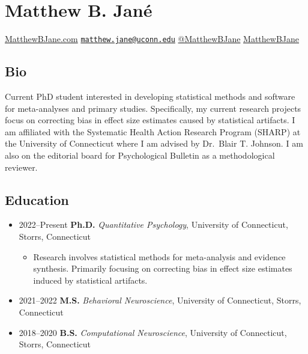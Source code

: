 \documentclass[
  letterpaper,
  DIV=11,
  numbers=noendperiod]{scrartcl}
\author{}
\date{}
\providecommand{\tightlist}{%
  \setlength{\itemsep}{0pt}\setlength{\parskip}{0pt}}\usepackage{longtable,booktabs,array}
\begin{document}
\ifdefined\Shaded\renewenvironment{Shaded}{\begin{tcolorbox}[enhanced, sharp corners, boxrule=0pt, frame hidden, interior hidden, breakable, borderline west={3pt}{0pt}{shadecolor}]}{\end{tcolorbox}}\fi

\hypertarget{matthew-b.-januxe9}{%
\section{Matthew B. Jané}\label{matthew-b.-januxe9}}

 \href{https://www.matthewbjane.com}{MatthewBJane.com}
\textbar{} 
\href{mailto:matthew.jane@uconn.edu}{\nolinkurl{matthew.jane@uconn.edu}}
\textbar{} 
\href{https://www.twitter.com/MatthewBJane}{@MatthewBJane} \textbar{}
 \href{https://www.github.io/MatthewBJane}{MatthewBJane}

\hypertarget{bio}{%
\subsection{\texorpdfstring{ Bio}{ Bio}}\label{bio}}

Current PhD student interested in developing statistical methods and
software for meta-analyses and primary studies. Specifically, my current
research projects focus on correcting bias in effect size estimates
caused by statistical artifacts. I am affiliated with the Systematic
Health Action Research Program (SHARP) at the University of Connecticut
where I am advised by Dr.~Blair T. Johnson. I am also on the editorial
board for Psychological Bulletin as a methodological reviewer.

\hypertarget{education}{%
\subsection{\texorpdfstring{ Education}{ Education}}\label{education}}

\begin{itemize}
\item
  2022--Present \textbar{} \textbf{Ph.D.} \emph{Quantitative
  Psychology}, University of Connecticut, Storrs, Connecticut

  \begin{itemize}
  \tightlist
  \item
    Research involves statistical methods for meta-analysis and evidence
    synthesis. Primarily focusing on correcting bias in effect size
    estimates induced by statistical artifacts.
  \end{itemize}
\item
  2021--2022 \textbar{} \textbf{M.S.} \emph{Behavioral Neuroscience},
  University of Connecticut, Storrs, Connecticut
\item
  2018--2020 \textbar{} \textbf{B.S.} \emph{Computational Neuroscience},
  University of Connecticut, Storrs, Connecticut
\end{itemize}
\end{document}
